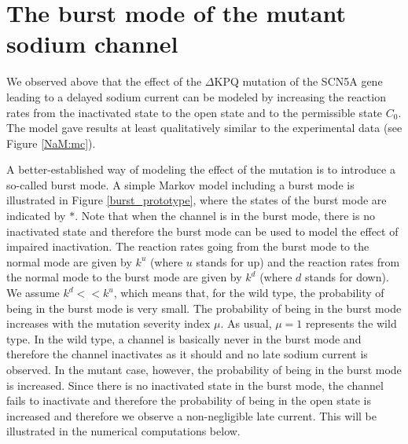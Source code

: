 
\chapter[The burst mode]{The burst mode of the mutant sodium channel}
\label{burst_chap}

We observed above that the effect of the $\Delta$KPQ mutation of the SCN5A
gene leading to a delayed sodium current can be modeled by increasing the
reaction rates from the inactivated state to the open state and to the
permissible state $C_{0}$. The model gave results at least qualitatively 
similar to the experimental data (see Figure \ref{NaM:mc}). 

A better-established way of
modeling the effect of the mutation is to introduce a so-called burst mode.
A simple Markov model including a burst mode is illustrated in Figure \ref{burst_prototype}, where the states of the burst mode
are indicated by $\ast$. Note that when the channel is in the burst mode,
there is no inactivated state and therefore the burst mode can be used to model the effect of impaired inactivation.
The reaction rates going from the burst mode to
the normal mode are given by $k^{u}$ (where $u$ stands for up) and the reaction rates from the normal mode
to the burst mode are given by $k^{d}$
(where $d$ stands for down). We assume $k^{d}<<k^{u}$, which means that, for the wild type, 
the probability of being in the burst mode is very small. The probability
of being in the burst mode increases with the mutation severity index $\mu$.
As usual, $\mu=1$ represents the wild type. In the wild type, a channel is basically never in the burst mode and therefore the channel inactivates as it should and no late sodium current is observed. In the mutant case, however, the probability of being in the burst mode is increased. Since there is no inactivated state in the burst mode, the channel fails to inactivate and therefore the probability of being in the open state is increased and therefore we observe a non-negligible late current. This will be illustrated in the numerical computations below.

